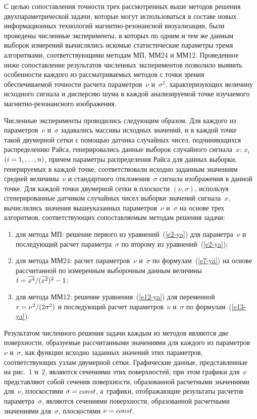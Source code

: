\begin{multicols}{2}
    С целью сопоставления точности трех рас\-смотренных выше методов решения
двух\-па\-ра\-мет\-ри\-че\-ской задачи, которые могут использоваться в \mbox{составе} новых
информационных технологий маг\-нит\-но-ре\-зо\-нансной визуализации, были проведены
чис\-лен\-ные эксперименты, в которых по \mbox{одним} и тем же данным выборок измерений
вы\-чис\-ля\-лись искомые статистические параметры тремя алгоритмами, соответствующими
методам МП, ММ24 и ММ12. Проведенное ниже сопоставление результатов чис\-лен\-ных
экспериментов позволило выявить особенности каждого из рассматриваемых методов с
точки зрения обеспечиваемой точности расчета параметров~$\nu$ и~$\sigma^2$,
характеризующих величину исходного сигнала и дисперсию шума в каж\-дой
анализируемой точке изучаемого магнитно-ре\-зо\-нанс\-ного изображения.

    Численные эксперименты проводились следующим образом. Для каждого из
параметров~$\nu$ и~$\sigma$ задавались массивы исходных значений, и в каждой точке
такой двумерной сетки с помощью датчика случайных чисел, подчиняющихся
распределению Райса, генерировались данные выборок случайного\linebreak
 сигнала~$x$: $x_i$
$(i\hm= 1,\ldots ,n)$, причем параметры распределе\-ния Райса для данных выборки,
генерируемых в каждой точке, соответствовали исходно заданным значениям средней
величины~$\nu$ и стандартного отклонения~$\sigma$ сигнала изображения в \mbox{данной}
точке. Для каждой точки двумерной сетки в плоскости $(\nu, \sigma)$, используя
сгенерированные датчиком случайных чисел выборки значений сигнала~$x$,
вычислялись значения вышеуказанных параметров~$\nu$ и~$\sigma$ на основе трех
алгоритмов, соответствующих сопоставляемым методам решения задачи:
    \begin{enumerate}[(1)]
    \item для метода МП: решение первого из уравнений~(\ref{e2-ya}) для
параметра~$\nu$ и последующий расчет параметра~$\sigma$ по второму из
уравнений~(\ref{e2-ya});
    \item для метода ММ24: расчет параметров~$\nu$ и~$\sigma$ по
    формулам~(\ref{e7-ya}) на основе рассчитанной по измеренным выборочным данным
величины  $t\hm= \overline{x^4}/(\overline{x^2})^2-1$;
    \item для метода ММ12: решение уравнения~(\ref{e12-ya}) для переменной $r\hm=
\nu^2/(2\sigma^2)$ и последующий расчет параметров~$\nu$ и~$\sigma$ по
формулам~(\ref{e13-ya}).
    \end{enumerate}

    Результатом численного решения задачи каж\-дым из методов являются две
поверхности, образуемые рассчитанными значениями для каждого из параметров~$\nu$
и~$\sigma$, как функции исходно заданных значений этих параметров, соответствующих
узлам двумерной сетки. Графические данные, пред\-став\-лен\-ные на рис.~1 и~2, являются
сечениями этих поверхностей, при этом графики для~$\nu$ пред\-став\-ля\-ют собой сечения
поверхности, образованной расчетными значениями для~$\nu$, плоскостями $\sigma
\hm=const$, а~графики, отображающие результаты расчетов параметра~$\sigma$, являются
сечениями по\-верх\-ности, образованной расчетными значениями для~$\sigma$,
плоскостями $\nu\hm=const$.




\end{multicols}
